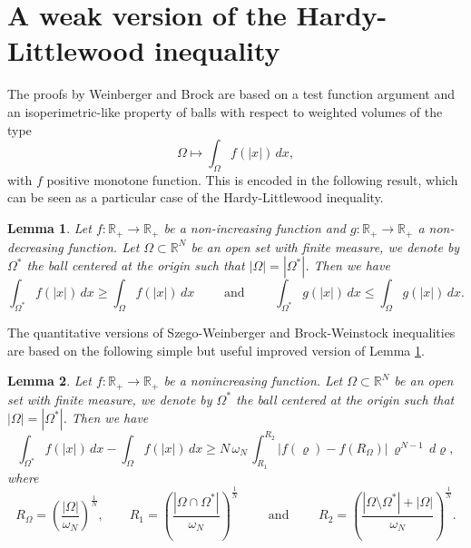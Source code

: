 \documentclass{amsart}
\newtheorem{lemma}{Lemma}[section]
\theoremstyle{definition}
\numberwithin{equation}{section}
\begin{document}
\section{A weak version of the Hardy-Littlewood inequality}

The proofs by Weinberger and Brock are based on a test function argument and an isoperimetric-like property of balls with respect to weighted volumes of the type
\[
\Omega\mapsto \int_\Omega f(|x|)\,dx,
\]
with $f$ positive monotone function.
This is encoded in the following result, which can be seen as a particular case of the Hardy-Littlewood inequality.
\begin{lemma}
\label{lm:HL}
Let $f:\mathbb{R}_+\to\mathbb{R}_+$ be a non-increasing function and $g:\mathbb{R}_+\to\mathbb{R}_+$ a non-decreasing function. Let $\Omega\subset\mathbb{R}^N$ be an open set with finite measure, we denote by $\Omega^*$ the ball centered at the origin such that $|\Omega|=|\Omega^*|$. Then we have
\[
\int_{\Omega^*} f(|x|)\, dx\ge \int_{\Omega} f(|x|)\, dx\qquad \mbox{ and }\qquad \int_{\Omega^*} g(|x|)\, dx\le \int_{\Omega} g(|x|)\, dx.
\]
\end{lemma}
The quantitative versions of Szego-Weinberger and Brock-Weinstock inequalities are based on the following simple but useful improved version of Lemma \ref{lm:HL}.
\begin{lemma}
\label{lm:HLquanto}
Let $f:\mathbb{R}_+\to\mathbb{R}_+$ be a nonincreasing function. Let $\Omega\subset\mathbb{R}^N$ be an open set with finite measure, we denote by $\Omega^*$ the ball centered at the origin such that $|\Omega|=|\Omega^*|$. Then we have
\begin{equation}
\label{HLquanto}
\int_{\Omega^*} f(|x|)\, dx-\int_{\Omega} f(|x|)\, dx\ge N\,\omega_N\, \int_{R_1}^{R_2} |f(\varrho)-f(R_\Omega)|\,\varrho^{N-1}\, d\varrho,
\end{equation}
where 
\begin{equation}
\label{raggi}
R_\Omega=\left(\frac{|\Omega|}{\omega_N}\right)^\frac{1}{N},\qquad R_1=\left(\frac{|\Omega\cap\Omega^*|}{\omega_N}\right)^\frac{1}{N}\qquad \mbox{ and }\qquad R_2=\left(\frac{|\Omega\setminus\Omega^*|+|\Omega|}{\omega_N}\right)^\frac{1}{N}.
\end{equation}
\end{lemma}
\end{document}
